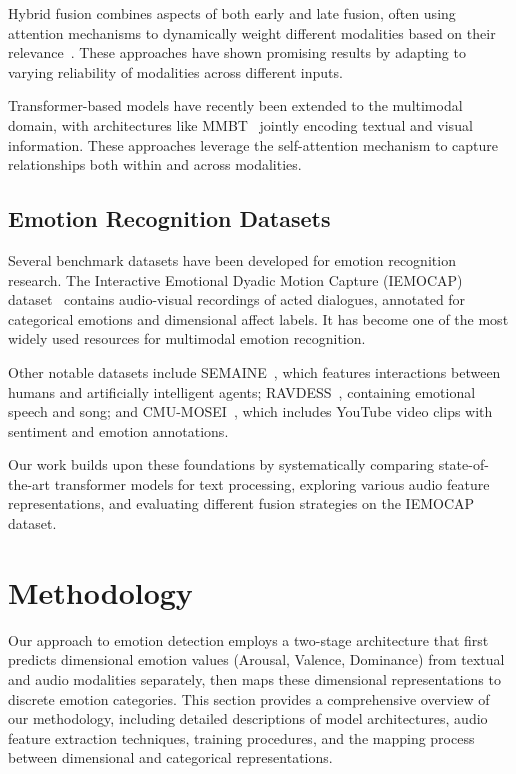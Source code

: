 \documentclass[12pt]{article}
\begin{document}
Hybrid fusion combines aspects of both early and late fusion, often using attention mechanisms to dynamically weight different modalities based on their relevance~\cite{zadeh2018memory}. These approaches have shown promising results by adapting to varying reliability of modalities across different inputs.

Transformer-based models have recently been extended to the multimodal domain, with architectures like MMBT~\cite{kiela2019supervised} jointly encoding textual and visual information. These approaches leverage the self-attention mechanism to capture relationships both within and across modalities.

\subsection{Emotion Recognition Datasets}
Several benchmark datasets have been developed for emotion recognition research. The Interactive Emotional Dyadic Motion Capture (IEMOCAP) dataset~\cite{busso2008iemocap} contains audio-visual recordings of acted dialogues, annotated for categorical emotions and dimensional affect labels. It has become one of the most widely used resources for multimodal emotion recognition.

Other notable datasets include SEMAINE~\cite{mckeown2012semaine}, which features interactions between humans and artificially intelligent agents; RAVDESS~\cite{livingstone2018ryerson}, containing emotional speech and song; and CMU-MOSEI~\cite{zadeh2018multimodal}, which includes YouTube video clips with sentiment and emotion annotations.

Our work builds upon these foundations by systematically comparing state-of-the-art transformer models for text processing, exploring various audio feature representations, and evaluating different fusion strategies on the IEMOCAP dataset.

\section{Methodology}
\label{sec:methodology}
Our approach to emotion detection employs a two-stage architecture that first predicts dimensional emotion values (Arousal, Valence, Dominance) from textual and audio modalities separately, then maps these dimensional representations to discrete emotion categories. This section provides a comprehensive overview of our methodology, including detailed descriptions of model architectures, audio feature extraction techniques, training procedures, and the mapping process between dimensional and categorical representations.
\end{document}
